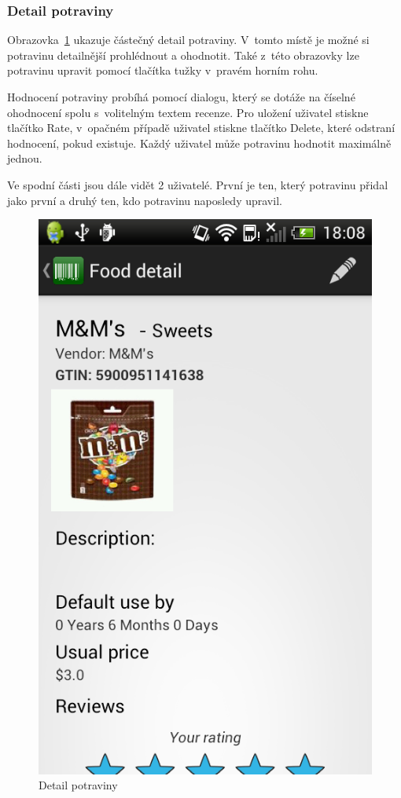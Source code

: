\documentclass[thesis=B,czech]{FITthesis}[2013/10/20]
\begin{document}
\clearpage

\subsubsection{Detail potraviny}

Obrazovka~\ref{fig:AppFoodDetail} ukazuje částečný detail potraviny. V~tomto místě je možné si potravinu detailnější prohlédnout a ohodnotit. Také z~této obrazovky lze potravinu upravit pomocí tlačítka tužky v~pravém horním rohu.

Hodnocení potraviny probíhá pomocí dialogu, který se dotáže na číselné ohodnocení spolu s~volitelným textem recenze. Pro uložení uživatel stiskne tlačítko Rate, v~opačném případě uživatel stiskne tlačítko Delete, které odstraní hodnocení, pokud existuje. Každý uživatel může potravinu hodnotit maximálně jednou.

Ve spodní části jsou dále vidět 2 uživatelé. První je ten, který potravinu přidal jako první a druhý ten, kdo potravinu naposledy upravil.

\begin{figure}[H]
  \centering
  \includegraphics[scale=0.4]{screenshots/app_food_detail.png}
  \caption{Detail potraviny}
  \label{fig:AppFoodDetail}
\end{figure}
\end{document}
